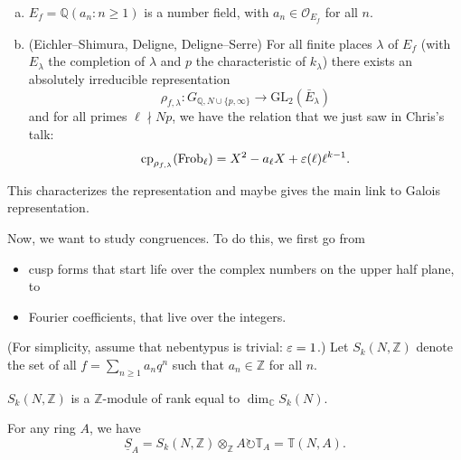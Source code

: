 \documentclass[reqno]{amsart} 
\begin{document}
\begin{example}
\begin{enumerate}
    \begin{theorem}
      \begin{enumerate}[(a)]
      \item\label{enumerate:cq6sj5bs5p} $E_f = \mathbb{Q}(a_n : n \geq 1)$ is a number field, with $a_n \in \mathcal{O}_{E_f}$ for all $n$.
      \item\label{enumerate:cq6sj5bt7j} (Eichler--Shimura, Deligne, Deligne--Serre) For all finite places $\lambda$ of $E_f$ (with $E_\lambda$ the completion of $\lambda$ and $p$ the characteristic of $k_\lambda$) there exists an absolutely irreducible representation
        \begin{equation*}
          \rho_{f, \lambda} : G_{\mathbb{Q}, N \cup \{p, \infty\}} \rightarrow \mathrm{GL}_2(\bar{E}_\lambda)
        \end{equation*}
        and for all primes $\ell \nmid N p$, we have the relation that we just saw in Chris's talk:
        \begin{equation*}
          \mathrm{c p}_{\rho_{f , \lambda}}(\mathrm{Frob}_{\ell}) = X^2 - a_{\ell} X + \varepsilon(\ell) \ell^{k - 1}.
        \end{equation*}
      \end{enumerate}
    \end{theorem}
    This characterizes the representation  and maybe gives the main link to Galois representation.
  \end{enumerate}
\end{example}

Now, we want to study congruences.  To do this, we first go from
\begin{itemize}
\item cusp forms that start life over the complex numbers on the upper half plane, to
\item Fourier coefficients, that live over the integers.
\end{itemize}
(For simplicity, assume that nebentypus is trivial: $\varepsilon = 1$.)  Let $S_k(N, \mathbb{Z})$ denote the set of all $f = \sum_{n \geq 1} a_n q^n$ such that $a_n \in \mathbb{Z}$ for all $n$.
\begin{fact}
  $S_k(N, \mathbb{Z})$ is a $\mathbb{Z}$-module of rank equal to $\dim_{\mathbb{C}} S_k(N)$.
\end{fact}
For any ring $A$, we have
\begin{equation*}
  \underline{S}_{A} = S_k(N, \mathbb{Z}) \otimes_{\mathbb{Z}} A \circlearrowright \mathbb{T}_A = \mathbb{T}(N, A).
\end{equation*}
\end{document}
